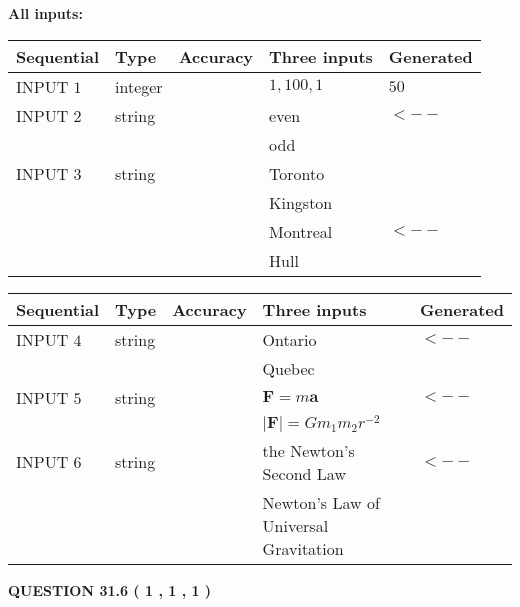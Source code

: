 \documentclass[12pt]{article}
\begin{document}
   
   
   
\noindent\vspace{0.1in}\hspace{-0.08in} {\textbf{\Large{All inputs: }}}
   
   
  
  
\noindent\begin{tabular}{|l|l|l|l|l|}
\hline
 Sequential & Type & Accuracy & Three inputs & Generated \\ 
\hline
 
 
  INPUT $            1 $ & integer &  & $
 1
 , 
 100
 , 
 1
 $ & $ 50 $ 
 \\  \hline  
 
 
  INPUT $            2 $ & string & & 
 even & 
  $ <-- $ 
  \\
  & & & 
 odd & 
 \\  \hline  
 
 
  INPUT $            3 $ & string & & 
 Toronto & 
  \\
  & & & 
 Kingston & 
  \\
  & & & 
 Montreal & 
  $ <-- $ 
  \\
  & & & 
 Hull & 
 \\  \hline  
 \end{tabular}
   
   
  
  
\noindent\begin{tabular}{|l|l|l|l|l|}
\hline
 Sequential & Type & Accuracy & Three inputs & Generated \\ 
\hline
 
 
  INPUT $            4 $ & string & & 
 Ontario & 
  $ <-- $ 
  \\
  & & & 
 Quebec & 
 \\  \hline  
 
 
  INPUT $            5 $ & string & & 
 $\mathbf{F}=m\mathbf{a}$ & 
  $ <-- $ 
  \\
  & & & 
 $\left| \mathbf{F}\right| =Gm_1m_2r^{-2}$ & 
 \\  \hline  
 
 
  INPUT $            6 $ & string & & 
 the Newton's Second Law & 
  $ <-- $ 
  \\
  & & & 
 Newton's Law of Universal Gravitation & 
 \\  \hline  
 \end{tabular}
   
   
  
\vspace{0.2in}
  
{\textbf{\Large{QUESTION
31.6 
 (           1 ,           1 ,           1 )
}}}
  
\end{document}

